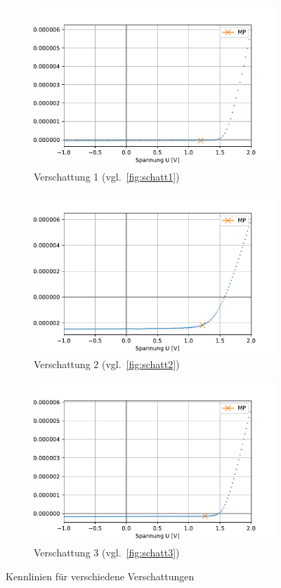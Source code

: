 \documentclass[slug=SZ, room=Hermann-Krone-Bau\,\ Labor\ 1.25, supervisor=Martin\ Kroll]{../../Lab_Report_LaTeX/lab_report}
\begin{document}
\begin{figure}[H]\centering
        \begin{subfigure}[b]{1\textwidth}\centering
               
\includegraphics[width=.5\columnwidth]{figs/python/C/3x3_verschattung_1.pdf}
\caption{Verschattung 1 (vgl.~\ref{fig:schatt1})}
\label{diag:verschattung1}
        \end{subfigure}
        \begin{subfigure}[b]{1\textwidth}\centering
                \includegraphics[width=.6\columnwidth]{figs/python/C/3x3_verschattung_2.pdf}
                \caption{Verschattung 2 (vgl.~\ref{fig:schatt2})}
                \label{diag:verschattung2}
        \end{subfigure}
        \begin{subfigure}[b]{1\textwidth}\centering
                \includegraphics[width=.6\columnwidth]{figs/python/C/3x3_verschattung_3.pdf}
                \caption{Verschattung 3 (vgl.~\ref{fig:schatt3})}
                \label{diag:verschattung3}
        \end{subfigure}
        \caption{Kennlinien für verschiedene Verschattungen}
        \label{fig:verschattung}
\end{figure}
\end{document}
